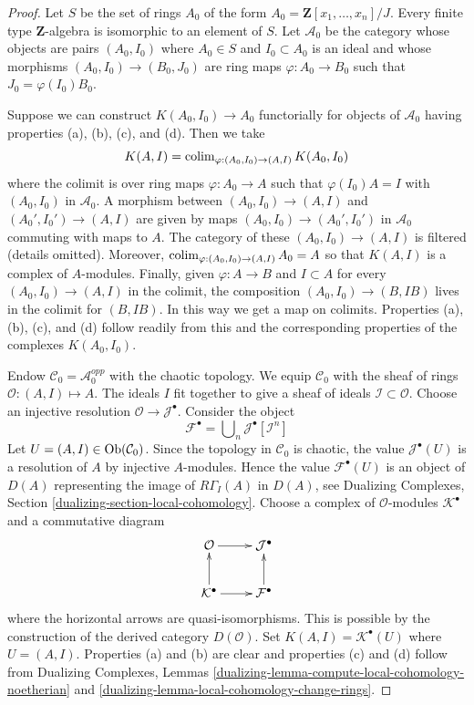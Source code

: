 \begin{proof}
Let $S$ be the set of rings $A_0$ of the form
$A_0 = \mathbf{Z}[x_1, \ldots, x_n]/J$.
Every finite type $\mathbf{Z}$-algebra is isomorphic to
an element of $S$. Let $\mathcal{A}_0$ be the category whose objects
are pairs $(A_0, I_0)$ where $A_0 \in S$ and $I_0 \subset A_0$
is an ideal and whose morphisms $(A_0, I_0) \to (B_0, J_0)$ are
ring maps $\varphi : A_0 \to B_0$ such that $J_0 = \varphi(I_0)B_0$.

\medskip\noindent
Suppose we can construct $K(A_0, I_0) \to A_0$ functorially for
objects of $\mathcal{A}_0$ having properties (a), (b), (c), and (d).
Then we take
$$
K(A, I) = \mathop{\mathrm{colim}}\nolimits_{\varphi : (A_0, I_0) \to (A, I)} K(A_0, I_0)
$$
where the colimit is over ring maps $\varphi : A_0 \to A$ such
that $\varphi(I_0)A = I$ with $(A_0, I_0)$ in $\mathcal{A}_0$.
A morphism between $(A_0, I_0) \to (A, I)$ and $(A_0', I_0') \to (A, I)$
are given by maps $(A_0, I_0) \to (A_0', I_0')$ in $\mathcal{A}_0$
commuting with maps to $A$.
The category of these $(A_0, I_0) \to (A, I)$ is filtered
(details omitted). Moreover, $\mathop{\mathrm{colim}}\nolimits_{\varphi : (A_0, I_0) \to (A, I)} A_0 = A$
so that $K(A, I)$ is a complex of $A$-modules.
Finally, given $\varphi : A \to B$ and $I \subset A$
for every $(A_0, I_0) \to (A, I)$ in the colimit, the composition
$(A_0, I_0) \to (B, IB)$ lives in the colimit for $(B, IB)$.
In this way we get a map on colimits. Properties (a), (b), (c), and (d)
follow readily from this and the corresponding
properties of the complexes $K(A_0, I_0)$.

\medskip\noindent
Endow $\mathcal{C}_0 = \mathcal{A}_0^{opp}$ with the chaotic topology.
We equip $\mathcal{C}_0$ with the sheaf of rings
$\mathcal{O} : (A, I) \mapsto A$. The ideals $I$ fit together to give a
sheaf of ideals $\mathcal{I} \subset \mathcal{O}$.
Choose an injective resolution $\mathcal{O} \to \mathcal{J}^\bullet$.
Consider the object
$$
\mathcal{F}^\bullet = \bigcup\nolimits_n \mathcal{J}^\bullet[\mathcal{I}^n]
$$
Let $U = (A, I) \in \mathop{\mathrm{Ob}}\nolimits(\mathcal{C}_0)$.
Since the topology in $\mathcal{C}_0$ is chaotic, the value
$\mathcal{J}^\bullet(U)$ is a resolution of $A$ by injective
$A$-modules. Hence the value $\mathcal{F}^\bullet(U)$ is an
object of $D(A)$ representing the image of $R\Gamma_I(A)$ in $D(A)$, see
Dualizing Complexes, Section \ref{dualizing-section-local-cohomology}.
Choose a complex of $\mathcal{O}$-modules $\mathcal{K}^\bullet$
and a commutative diagram
$$
\xymatrix{
\mathcal{O} \ar[r] & \mathcal{J}^\bullet \\
\mathcal{K}^\bullet \ar[r] \ar[u] & \mathcal{F}^\bullet \ar[u]
}
$$
where the horizontal arrows are quasi-isomorphisms. This is possible
by the construction of the derived category $D(\mathcal{O})$.
Set $K(A, I) = \mathcal{K}^\bullet(U)$ where $U = (A, I)$.
Properties (a) and (b) are clear and properties (c) and (d)
follow from Dualizing Complexes, Lemmas
\ref{dualizing-lemma-compute-local-cohomology-noetherian} and
\ref{dualizing-lemma-local-cohomology-change-rings}.
\end{proof}

